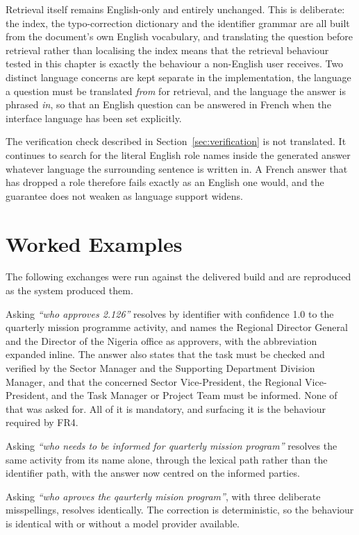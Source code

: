 Retrieval itself remains English-only and entirely unchanged. This is deliberate: the
index, the typo-correction dictionary and the identifier grammar are all built from the
document's own English vocabulary, and translating the question before retrieval rather
than localising the index means that the retrieval behaviour tested in this chapter is
exactly the behaviour a non-English user receives. Two distinct language concerns are
kept separate in the implementation, the language a question must be translated
\emph{from} for retrieval, and the language the answer is phrased \emph{in}, so that an
English question can be answered in French when the interface language has been set
explicitly.

The verification check described in Section~\ref{sec:verification} is not translated. It
continues to search for the literal English role names inside the generated answer
whatever language the surrounding sentence is written in. A French answer that has dropped
a role therefore fails exactly as an English one would, and the guarantee does not weaken
as language support widens.

\section{Worked Examples}

The following exchanges were run against the delivered build and are reproduced as the
system produced them.

Asking \textit{``who approves 2.126''} resolves by identifier with confidence 1.0 to the
quarterly mission programme activity, and names the Regional Director General and the
Director of the Nigeria office as approvers, with the abbreviation expanded inline. The
answer also states that the task must be checked and verified by the Sector Manager and
the Supporting Department Division Manager, and that the concerned Sector Vice-President,
the Regional Vice-President, and the Task Manager or Project Team must be informed. None
of that was asked for. All of it is mandatory, and surfacing it is the behaviour required
by FR4.

Asking \textit{``who needs to be informed for quarterly mission program''} resolves the
same activity from its name alone, through the lexical path rather than the identifier
path, with the answer now centred on the informed parties.

Asking \textit{``who aproves the qaurterly mision program''}, with three deliberate
misspellings, resolves identically. The correction is deterministic, so the behaviour is
identical with or without a model provider available.


